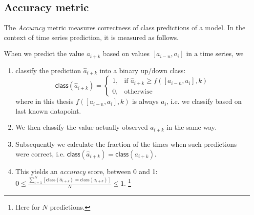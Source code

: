 \subsection{Accuracy metric}
The \emph{Accuracy}\cite{accuracy} metric measures correctness of class predictions of a model. In the context of time series prediction, it is measured as follows.

When we predict the value \(a_{i+k}\) based on values \([a_{i-n}, a_i]\) in a time series, we
\begin{enumerate}
	\item classify the prediction \(\hat{a}_{i+k}\) into a binary up/down class:
	      \[
		      \mathsf{class}(\hat{a}_{i+k}) =
		      \begin{cases}
			      1, & \text{if } \hat{a}_{i+k} \ge f([a_{i-n}, a_i], k) \\
			      0, & \text{otherwise}
		      \end{cases}
	      \]
	      where in this thesis \(f([a_{i-n}, a_i], k)\) is always \(a_i\), i.e. we classify based on last known datapoint.
	\item We then classify the value actually observed \(a_{i+k}\) in the same way.
	\item Subsequently we calculate the fraction of the times when such predictions were correct, i.e. \(\mathsf{class}(\hat{a}_{i+k}) = \mathsf{class}(a_{i+k})\).
	\item This yields an \emph{accuracy} score, between 0 and 1: \(0 \leq \frac{\sum_{i=1}^N[\mathsf{class}(\hat{a}_{i+k}) = \mathsf{class}(a_{i+k})]}{N} \leq 1\). \footnote{Here for \(N\) predictions.}
\end{enumerate}

























